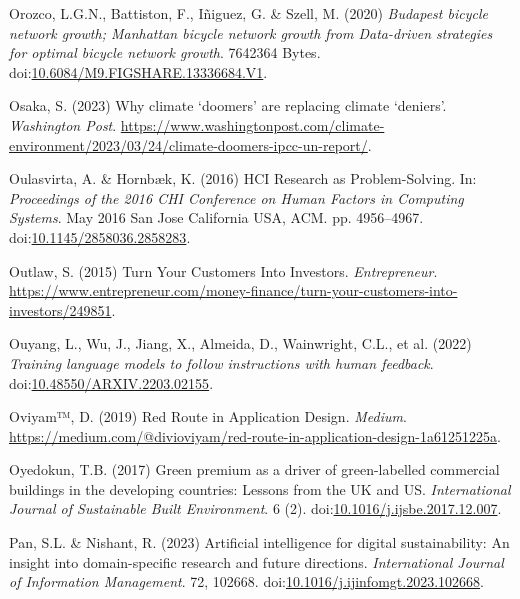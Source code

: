\documentclass[
  letterpaper,
  DIV=11,
  numbers=noendperiod]{scrartcl}
\newlength{\cslhangindent}
\newenvironment{CSLReferences}[2] %
 {\begin{list}{}{%
  \setlength{\itemindent}{0pt}
  \setlength{\leftmargin}{0pt}
  \setlength{\parsep}{0pt}
  \ifodd #1
   \setlength{\leftmargin}{\cslhangindent}
   \setlength{\itemindent}{-1\cslhangindent}
  \fi
  \setlength{\itemsep}{#2\baselineskip}}}
 {\end{list}}
\begin{document}
\begin{CSLReferences}{0}{1}
Orozco, L.G.N., Battiston, F., Iñiguez, G. \& Szell, M. (2020)
\emph{Budapest bicycle network growth; {Manhattan} bicycle network
growth from {Data-driven} strategies for optimal bicycle network
growth}. 7642364 Bytes.
doi:\href{https://doi.org/10.6084/M9.FIGSHARE.13336684.V1}{10.6084/M9.FIGSHARE.13336684.V1}.

Osaka, S. (2023) Why climate {`doomers'} are replacing climate
{`deniers'}. \emph{Washington Post}.
\url{https://www.washingtonpost.com/climate-environment/2023/03/24/climate-doomers-ipcc-un-report/}.

Oulasvirta, A. \& Hornbæk, K. (2016) {HCI Research} as
{Problem-Solving}. In: \emph{Proceedings of the 2016 {CHI Conference} on
{Human Factors} in {Computing Systems}}. May 2016 San Jose California
USA, ACM. pp. 4956--4967.
doi:\href{https://doi.org/10.1145/2858036.2858283}{10.1145/2858036.2858283}.

Outlaw, S. (2015) Turn {Your Customers Into Investors}.
\emph{Entrepreneur}.
\url{https://www.entrepreneur.com/money-finance/turn-your-customers-into-investors/249851}.

Ouyang, L., Wu, J., Jiang, X., Almeida, D., Wainwright, C.L., et al.
(2022) \emph{Training language models to follow instructions with human
feedback}.
doi:\href{https://doi.org/10.48550/ARXIV.2203.02155}{10.48550/ARXIV.2203.02155}.

Oviyam™, D. (2019) Red {Route} in {Application Design}. \emph{Medium}.
\url{https://medium.com/@divioviyam/red-route-in-application-design-1a61251225a}.

Oyedokun, T.B. (2017) Green premium as a driver of green-labelled
commercial buildings in the developing countries: {Lessons} from the
{UK} and {US}. \emph{International Journal of Sustainable Built
Environment}. 6 (2).
doi:\href{https://doi.org/10.1016/j.ijsbe.2017.12.007}{10.1016/j.ijsbe.2017.12.007}.

Pan, S.L. \& Nishant, R. (2023) Artificial intelligence for digital
sustainability: {An} insight into domain-specific research and future
directions. \emph{International Journal of Information Management}. 72,
102668.
doi:\href{https://doi.org/10.1016/j.ijinfomgt.2023.102668}{10.1016/j.ijinfomgt.2023.102668}.


\end{CSLReferences}
\end{document}
